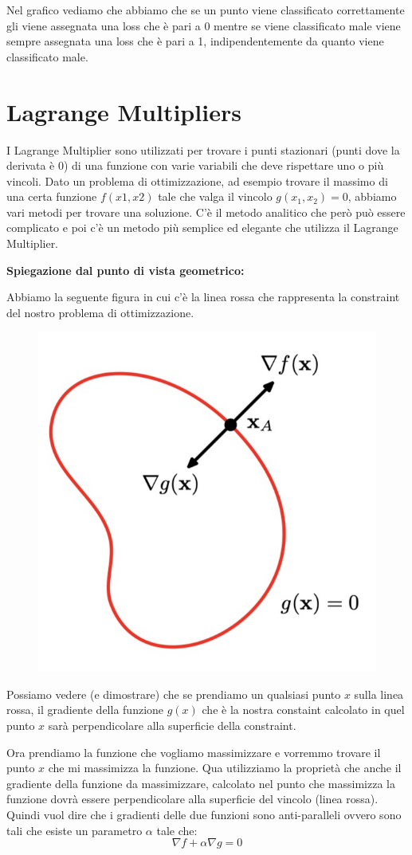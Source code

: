 \documentclass[14pt]{extreport}
\begin{document}
Nel grafico vediamo che abbiamo che se un punto viene classificato correttamente gli viene assegnata una loss che è pari a 0 mentre se viene
classificato male viene sempre assegnata una loss che è pari a 1, indipendentemente da quanto viene classificato male.


\section{Lagrange Multipliers}

I Lagrange Multiplier sono utilizzati per trovare i punti stazionari (punti dove la derivata è 0) di una funzione con varie variabili che deve
rispettare uno o più vincoli. Dato un problema di ottimizzazione, ad esempio trovare il massimo di una certa funzione $f(x1,x2)$ tale che valga il
vincolo $g(x_1, x_2) = 0$, abbiamo vari metodi per trovare una soluzione. C'è il metodo analitico che però può essere complicato e poi c'è un metodo
più semplice ed elegante che utilizza il Lagrange Multiplier.

\textbf{Spiegazione dal punto di vista geometrico:}

Abbiamo la seguente figura in cui c'è la linea rossa che rappresenta la constraint del nostro problema di ottimizzazione.

\begin{figure}[H]
\centering
\includegraphics[width=0.5\linewidth]{348.jpeg}
\end{figure}


Possiamo vedere (e dimostrare) che se prendiamo un qualsiasi punto $x$ sulla linea rossa, il gradiente della funzione $g(x)$ che è la nostra constaint
calcolato in quel punto $x$ sarà perpendicolare alla superficie della constraint.

Ora prendiamo la funzione che vogliamo massimizzare e vorremmo trovare il punto $x$ che mi massimizza la funzione. Qua utilizziamo la proprietà che
anche il gradiente della funzione da massimizzare, calcolato nel punto che massimizza la funzione dovrà essere perpendicolare alla superficie del
vincolo (linea rossa). Quindi vuol dire che i gradienti delle due funzioni sono anti-paralleli ovvero sono tali che esiste un parametro $\alpha$ tale
che: $$\nabla f + \alpha \nabla g = 0$$
\end{document}
